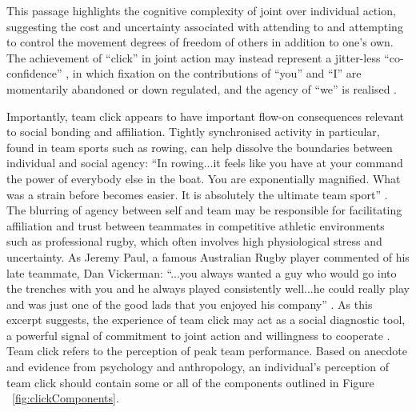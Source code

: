 \begin{CJK}{UTF8}{gbsn}
This passage highlights the cognitive complexity of joint over individual action, suggesting the cost and uncertainty associated with attending to and attempting to control the movement degrees of freedom of others in addition to one's own.  The achievement of ``click'' in joint action may instead represent a jitter-less ``co-confidence'' \citep{Noy2015,Noy2017}, in which fixation on the contributions of ``you'' and ``I'' are momentarily abandoned or down regulated, and the agency of ``we'' is realised \citep{Gallotti2013,Friston2015}.


Importantly, team click appears to have important flow-on consequences relevant to social bonding and affiliation. Tightly synchronised activity in particular, found in team sports such as rowing, can help dissolve the boundaries between individual and social agency: ``In rowing...it feels like you have at your command the power of everybody else in the boat. You are exponentially magnified. What was a strain before becomes easier. It is absolutely the ultimate team sport'' \citep[x]{Brown2016}.
The blurring of agency between self and team may be responsible for facilitating affiliation and trust between teammates in competitive athletic environments such as professional rugby, which often involves high physiological stress and uncertainty.  As Jeremy Paul, a famous Australian Rugby player commented of his late teammate, Dan Vickerman: ``...you always wanted a guy who would go into the trenches with you and he always played consistently well...he could really play and was just one of the good lads that you enjoyed his company'' \citep{Fox-Sports2017}.  As this excerpt suggests, the experience of team click may act as a social diagnostic tool, a powerful signal of commitment to joint action and willingness to cooperate \citep{Reddish2013a}. \\

Team click refers to the perception of peak team performance.  Based on anecdote and evidence from psychology and anthropology, an individual's perception of team click should contain some or all of the components outlined in Figure ~\ref{fig:clickComponents}.


\end{CJK}
